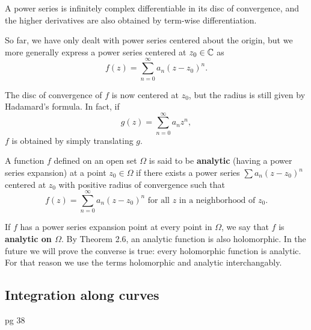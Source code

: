\documentclass{exam}
\begin{document}
\begin{corollary}
    A power series is infinitely complex differentiable in its disc of convergence, and the higher derivatives are also obtained by term-wise differentiation.
\end{corollary}

So far, we have only dealt with power series centered about the origin, but we more generally express a power series centered at $z_0\in\mathbb{C}$ as
$$f(z) = \sum_{n = 0}^\infty a_n(z - z_0)^n.$$

The disc of convergence of $f$ is now centered at $z_0$, but the radius is still given by Hadamard's formula. In fact, if
$$g(z) = \sum_{n = 0}^\infty a_n z^n,$$
$f$ is obtained by simply translating $g$.

A function $f$ defined on an open set $\Omega$ is said to be \textbf{analytic} (having a power series expansion) at a point $z_0\in\Omega$ if
there exists a power series $\sum a_n(z - z_0)^n$ centered at $z_0$ with positive radius of convergence such that
$$f(z) = \sum_{n = 0}^\infty a_n(z - z_0)^n\text{ for all $z$ in a neighborhood of $z_0$}.$$

If $f$ has a power series expansion point at every point in $\Omega$, we say that $f$ is \textbf{analytic on $\Omega$}. By Theorem 2.6, an
analytic function is also holomorphic. In the future we will prove the converse is true: every holomorphic function is analytic. For that
reason we use the terms holomorphic and analytic interchangably.

\subsection{Integration along curves}
pg 38
\end{document}
